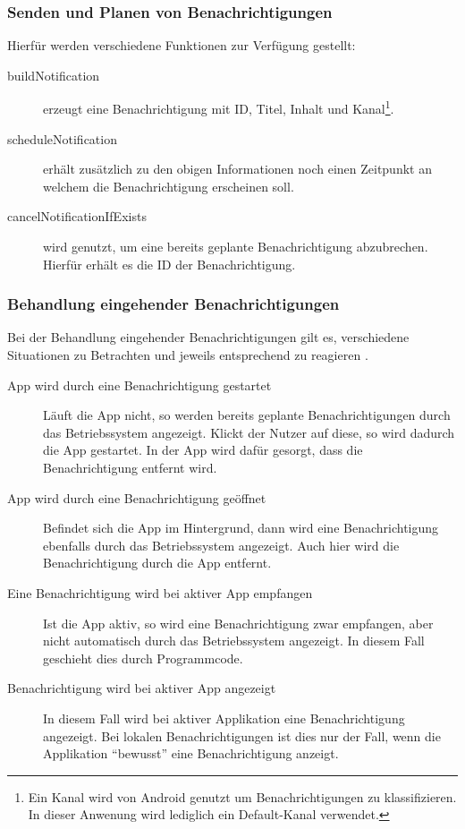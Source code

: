 \subsubsection{Senden und Planen von Benachrichtigungen}
Hierfür werden verschiedene Funktionen zur Verfügung gestellt:
\begin{description}
    \item[buildNotification] erzeugt eine Benachrichtigung mit ID, Titel, Inhalt und Kanal\footnote{Ein Kanal wird von Android genutzt um Benachrichtigungen zu klassifizieren. In dieser Anwenung wird lediglich ein Default-Kanal verwendet.}.
    \item[scheduleNotification] erhält zusätzlich zu den obigen Informationen noch einen Zeitpunkt an welchem die Benachrichtigung erscheinen soll.
    \item[cancelNotificationIfExists] wird genutzt, um eine bereits geplante Benachrichtigung abzubrechen. Hierfür erhält es die ID der Benachrichtigung.
\end{description}

\subsubsection{Behandlung eingehender Benachrichtigungen}
Bei der Behandlung eingehender Benachrichtigungen gilt es,
verschiedene Situationen zu Betrachten und jeweils entsprechend zu reagieren \cite{Introduc87:online}.
\begin{description}
    \item[App wird durch eine Benachrichtigung gestartet]
    Läuft die App nicht, so werden bereits geplante Benachrichtigungen durch das Betriebssystem angezeigt.
    Klickt der Nutzer auf diese, so wird dadurch die App gestartet.
    In der App wird dafür gesorgt, dass die Benachrichtigung entfernt wird.

    \item[App wird durch eine Benachrichtigung geöffnet]
    Befindet sich die App im Hintergrund,
    dann wird eine Benachrichtigung ebenfalls durch das Betriebssystem angezeigt.
    Auch hier wird die Benachrichtigung durch die App entfernt.

    \item[Eine Benachrichtigung wird bei aktiver App empfangen]
    Ist die App aktiv, so wird eine Benachrichtigung zwar empfangen,
    aber nicht automatisch durch das Betriebssystem angezeigt.
    In diesem Fall geschieht dies durch Programmcode.

    \item[Benachrichtigung wird bei aktiver App angezeigt]
    In diesem Fall wird bei aktiver Applikation eine Benachrichtigung angezeigt.
    Bei lokalen Benachrichtigungen ist dies nur der Fall,
    wenn die Applikation \enquote{bewusst} eine Benachrichtigung anzeigt.
\end{description}

